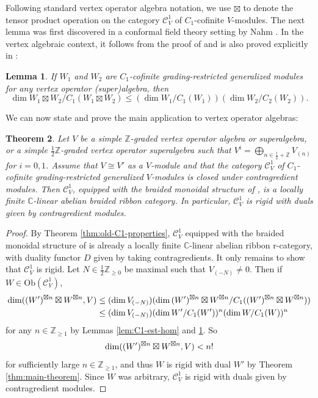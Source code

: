 \documentclass[11pt, reqno]{amsart}
\newtheorem{thm}{Theorem}[section]
\newtheorem{lem}[thm]{Lemma}
\theoremstyle{definition}\newtheorem{defi}[thm]{Definition}
\theoremstyle{definition}\newtheorem{rem}[thm]{Remark}
\theoremstyle{definition}\newtheorem{exam}[thm]{Example}
\theoremstyle{definition}\newtheorem{assum}[thm]{Assumption}
\newcommand{\cC}{\mathcal{C}}
\newcommand{\CC}{\mathbb{C}}
\newcommand{\ZZ}{\mathbb{Z}}
\let\hom\relax
\DeclareMathOperator{\hom}{Hom}
\begin{document}
Following standard vertex operator algebra notation, we use $\boxtimes$ to denote the tensor product operation on the category $\cC^1_V$ of $C_1$-cofinite $V$-modules. The next lemma was first discovered in a conformal field theory setting by Nahm \cite{Na}. In the vertex algebraic context, it follows from the proof of \cite[Key Theorem]{Mi} and is also proved explicitly in \cite[Theorem 3.5]{Hu}:
\begin{lem}\label{lem:C1-estimate-tens}
If $W_1$ and $W_2$ are $C_1$-cofinite grading-restricted generalized modules for any vertex operator (super)algebra, then
\begin{equation*}
\dim W_1\boxtimes W_2/C_1(W_1\boxtimes W_2)\leq (\dim W_1/C_1(W_1))(\dim W_2/C_2(W_2)).
\end{equation*}
\end{lem}

We can now state and prove the main application to vertex operator algebras:
\begin{thm}\label{thm:C1-cofinite-rigidity}
Let $V$ be a simple $\ZZ$-graded vertex operator algebra or superalgebra, or a simple $\frac{1}{2}\ZZ$-graded vertex operator superalgebra such that $V^i=\bigoplus_{n\in\frac{i}{2}+\ZZ} V_{(n)}$ for $i=0,1$. Assume that $V\cong V'$ as a $V$-module and that the category $\cC_V^1$ of $C_1$-cofinite grading-restricted generalized $V$-modules is closed under contragredient modules. Then $\cC_V^1$, equipped with the braided monoidal structure of \cite{HLZ8}, is a locally finite $\CC$-linear abelian braided ribbon category. In particular, $\cC^1_V$ is rigid with duals given by contragredient modules.
\end{thm}
\begin{proof}
By Theorem \ref{thm:old-C1-properties}, $\cC^1_V$ equipped with the braided monoidal structure of \cite{HLZ8} is already a locally finite $\CC$-linear abelian ribbon r-category, with duality functor $D$ given by taking contragredients. It only remains to show that $\cC^1_V$ is rigid. Let $N\in\frac{1}{2}\ZZ_{\geq 0}$ be maximal such that $V_{(-N)}\neq 0$. Then if $W\in\mathrm{Ob}(\cC_V^1)$,
\begin{align*}
\dim\hom((W')^{\boxtimes n}\boxtimes W^{\boxtimes n},V) &\leq(\dim V_{(-N)})(\dim\, (W')^{\boxtimes n}\boxtimes W^{\boxtimes n}/C_1((W')^{\boxtimes n}\boxtimes W^{\boxtimes n}))\\
& \leq (\dim V_{(-N)})(\dim W'/C_1(W'))^n(\dim W/C_1(W))^n
\end{align*}
for any $n\in\ZZ_{\geq 1}$ by Lemmas \ref{lem:C1-est-hom} and \ref{lem:C1-estimate-tens}. So
\begin{equation*}
\dim \hom((W')^{\boxtimes n}\boxtimes W^{\boxtimes n},V)< n!
\end{equation*}
for sufficiently large $n\in\ZZ_{\geq 1}$, and thus $W$ is rigid with dual $W'$ by Theorem \ref{thm:main-theorem}. Since $W$ was arbitrary, $\cC_V^1$ is rigid with duals given by contragredient modules.
\end{proof}
\end{document}
